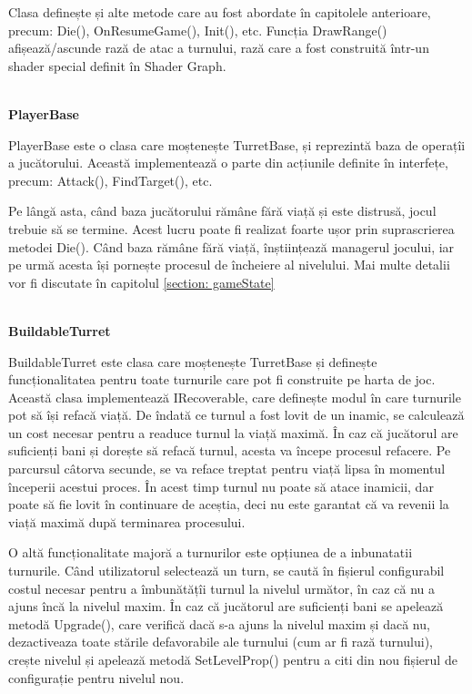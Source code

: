 \documentclass[12pt, a4paper]{article}
\begin{document}
	Clasa definește și alte metode care au fost abordate în capitolele anterioare, precum: Die(), OnResumeGame(), Init(), etc. Funcția DrawRange() afișează/ascunde rază de atac a turnului, rază care a fost construită într-un shader special definit în Shader Graph.
	
	\ \\
	\textbf{PlayerBase}
	
	PlayerBase este o clasa care moștenește TurretBase, și reprezintă baza de operațîi a jucătorului. Această implementează o parte din acțiunile definite în interfețe, precum: Attack(), FindTarget(), etc.
	\newline
	
	Pe lângă asta, când baza jucătorului rămâne fără viață și este distrusă, jocul trebuie să se termine. Acest lucru poate fi realizat foarte ușor prin suprascrierea metodei Die(). Când baza rămâne fără viață, înștiințează managerul jocului, iar pe urmă acesta își pornește procesul de încheiere al nivelului. Mai multe detalii vor fi discutate în capitolul \ref{section: gameState}
	
	\ \\
	\textbf{BuildableTurret}
	
	BuildableTurret este clasa care moștenește TurretBase și definește funcționalitatea pentru toate turnurile care pot fi construite pe harta de joc. Această clasa implementează IRecoverable, care definește modul în care turnurile pot să își refacă viață. De îndată ce turnul a fost lovit de un inamic, se calculează un cost necesar pentru a readuce turnul la viață maximă. În caz că jucătorul are suficienți bani și dorește să refacă turnul, acesta va începe procesul refacere. Pe parcursul câtorva secunde, se va reface treptat pentru viață lipsa în momentul începerii acestui proces. În acest timp turnul nu poate să atace inamicii, dar poate să fie lovit în continuare de aceștia, deci nu este garantat că va revenii la viață maximă după terminarea procesului.
	\newline
	
	O altă funcționalitate majoră a turnurilor este opțiunea de a inbunatatii turnurile. Când utilizatorul selectează un turn, se caută în fișierul configurabil costul necesar pentru a îmbunătățîi turnul la nivelul următor, în caz că nu a ajuns încă la nivelul maxim. În caz că jucătorul are suficienți bani se apelează metodă Upgrade(), care verifică dacă s-a ajuns la nivelul maxim și dacă nu, dezactiveaza toate stările defavorabile ale turnului (cum ar fi rază turnului), crește nivelul și apelează metodă SetLevelProp() pentru a citi din nou fișierul de configurație pentru nivelul nou.
	\newline
	
\end{document}
